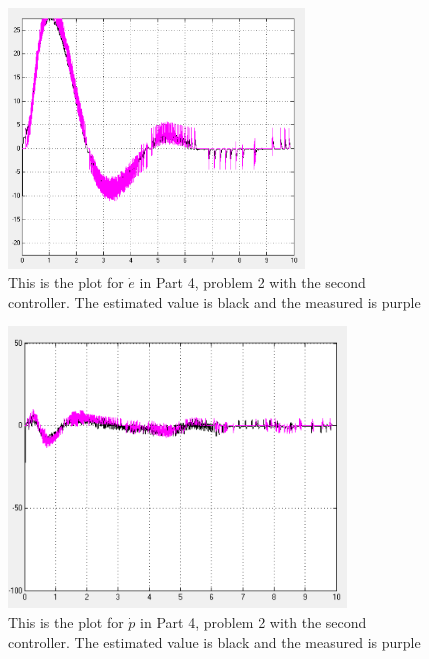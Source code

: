 \newpage

\begin{figure}[H]
    \centering
    \includegraphics[width=0.7\textwidth]{figures/P4p22_e_dot}
    \caption{This is the plot for $\dot{e}$ in Part 4, problem 2 with the second controller. The estimated value is black and the measured is purple}
    \label{fig:P4p22_e_dot}
\end{figure}

\begin{figure}[H]
    \centering
    \includegraphics[width=0.8\textwidth]{figures/P4p22_p_dot}
    \caption{This is the plot for $\dot{p}$ in Part 4, problem 2 with the second controller. The estimated value is black and the measured is purple}
    \label{fig:P4p22_p_dot}
\end{figure}

